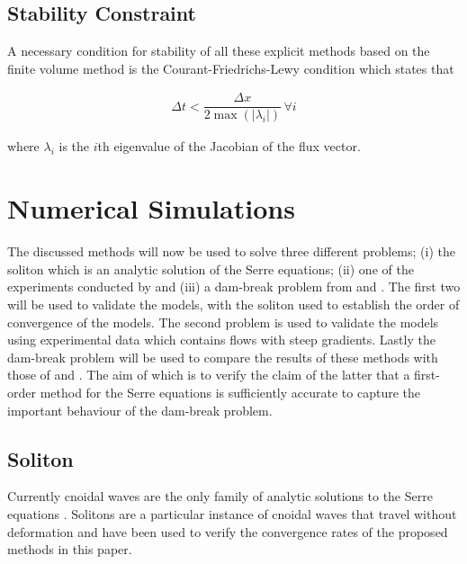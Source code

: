 \documentclass[SingleSpace,12pt,Proceedings]{Serre_ASCE}
\begin{document}
\subsection{Stability Constraint} %
A necessary condition for stability of all these explicit methods based on the finite volume method is the Courant-Friedrichs-Lewy condition \cite{Courant-etal-1928-32} which states that
\begin{linenomath*}
\begin{gather} \label{eq:CFLcond}
\Delta t < \dfrac{\Delta x}{2 \max\left(\left|\lambda_i\right|\right)} \, \forall i
\end{gather}
\end{linenomath*}
where $\lambda_i$ is the $i$th eigenvalue of the Jacobian of the flux vector. 
\section{Numerical Simulations}
\label{section:Numerical Simulations}
The discussed methods will now be used to solve three different problems; (i) the soliton which is an analytic solution of the Serre equations; (ii) one of the experiments conducted by  and (iii) a dam-break problem from  and . The first two will be used to validate the models, with the soliton used to establish the order of convergence of the models. The second problem is used to validate the models using experimental data which contains flows with steep gradients. Lastly the dam-break problem will be used to compare the results of these methods with those of  and . The aim of which is to verify the claim of the latter that a first-order method for the Serre equations is sufficiently accurate to capture the important behaviour of the dam-break problem. 
\subsection{Soliton}
\label{section:Convergence Rate}
Currently cnoidal waves are the only family of analytic solutions to the Serre equations \cite{Carter-Cienfuegos-2010-259}. Solitons are a particular instance of cnoidal waves that travel without deformation and have been used to verify the convergence rates of the proposed methods in this paper. 
\end{document}

